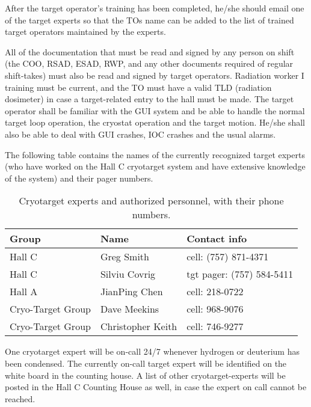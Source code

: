 {After the target operator's training has been completed, he/she should
email one of the target experts so that the TOs name can be added to
the list of trained target operators maintained by the experts.

All of the documentation that must be read and signed by any person on
shift (the COO, RSAD, ESAD, RWP, and any other documents required of
regular shift-takes) must also be read and signed by target operators.
Radiation worker I training must be current, and the TO must have a
valid TLD (radiation dosimeter) in case a target-related entry to the
hall must be made. The target operator shall be familiar with the GUI
system and be able to handle the normal target loop operation, the
cryostat operation and the target motion. He/she shall also be able to
deal with GUI crashes, IOC crashes and the usual alarms.


\begin{safetyen}{0}{0} 

The following table contains the names of the currently recognized
target experts (who have worked on the Hall C cryotarget system and
have extensive knowledge of the system) and their pager numbers.


\begin{table}[h]
\centering
\begin{tabular}{| l | l | l | }
\hline
Group & Name & Contact info    \\ \hline
Hall C & Greg Smith & cell: (757) 871-4371 \\ \hline
Hall C & Silviu Covrig & tgt pager: (757) 584-5411 \\ \hline 
Hall A & JianPing Chen & cell: 218-0722 \\ \hline
Cryo-Target Group & Dave Meekins & cell: 968-9076 \\ \hline 
Cryo-Target Group& Christopher Keith & cell: 746-9277 \\ \hline
\end{tabular}
\caption{Cryotarget experts and authorized personnel, with their phone numbers.}
\label{tab:cryotarg:personnel-con}
\end{table}

One cryotarget expert will be on-call 24/7 whenever hydrogen or
deuterium has been condensed.
The currently on-call target expert will be identified on the white board in the counting house. A list of other cryotarget-experts will be posted
in the Hall C Counting House as well, in case the expert on call cannot be reached.
\end{safetyen}
}

